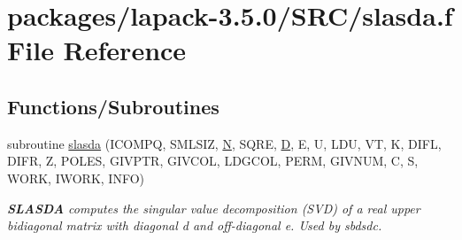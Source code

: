 \hypertarget{slasda_8f}{}\section{packages/lapack-\/3.5.0/\+S\+R\+C/slasda.f File Reference}
\label{slasda_8f}
\subsection*{Functions/\+Subroutines}
\begin{DoxyCompactItemize}
\item 
subroutine \hyperlink{group__auxOTHERauxiliary_gafe52aa918bfa2a863f122f39ae9e6404}{slasda} (I\+C\+O\+M\+P\+Q, S\+M\+L\+S\+I\+Z, \hyperlink{polmisc_8c_a0240ac851181b84ac374872dc5434ee4}{N}, S\+Q\+R\+E, \hyperlink{odrpack_8h_a7dae6ea403d00f3687f24a874e67d139}{D}, E, U, L\+D\+U, V\+T, K, D\+I\+F\+L, D\+I\+F\+R, Z, P\+O\+L\+E\+S, G\+I\+V\+P\+T\+R, G\+I\+V\+C\+O\+L, L\+D\+G\+C\+O\+L, P\+E\+R\+M, G\+I\+V\+N\+U\+M, C, S, W\+O\+R\+K, I\+W\+O\+R\+K, I\+N\+F\+O)
\begin{DoxyCompactList}\small\item\em {\bfseries S\+L\+A\+S\+D\+A} computes the singular value decomposition (S\+V\+D) of a real upper bidiagonal matrix with diagonal d and off-\/diagonal e. Used by sbdsdc. \end{DoxyCompactList}\end{DoxyCompactItemize}
